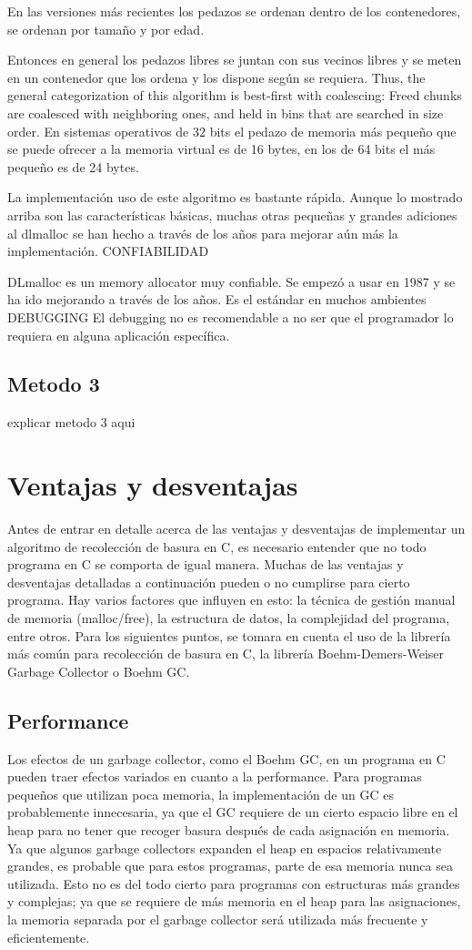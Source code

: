 \documentclass[11pt]{article} %
\begin{document}
En las versiones más recientes los pedazos se ordenan dentro de los contenedores, se ordenan por tamaño y por edad.

Entonces en general los pedazos libres se juntan con sus vecinos libres y se meten en un contenedor que los ordena y los dispone según se requiera.
Thus, the general categorization of this algorithm is best-first with coalescing: Freed chunks are coalesced with neighboring ones, and held in bins that are searched in size order.
En sistemas operativos de 32 bits el pedazo de memoria más pequeño que se puede ofrecer a la memoria virtual es de 16 bytes, en los de 64 bits el más pequeño es de 24 bytes.

La implementación  uso de este algoritmo es bastante rápida. Aunque lo mostrado arriba son las características básicas, muchas otras pequeñas y grandes adiciones al dlmalloc se han hecho a través de los años para mejorar aún más la implementación.
CONFIABILIDAD

DLmalloc es un memory allocator muy confiable. Se empezó a usar en 1987 y se ha ido mejorando a través de los años. Es el estándar en muchos ambientes
DEBUGGING
El debugging no es recomendable a no ser que el programador lo requiera en alguna aplicación específica.


\subsection{Metodo 3}
explicar metodo 3 aqui

\section{Ventajas y desventajas}
	Antes de entrar en detalle acerca de las ventajas y desventajas de implementar un algoritmo de recolección de basura en C, es necesario entender que no todo programa en C se comporta de igual manera. Muchas de las ventajas y desventajas detalladas a continuación pueden o no cumplirse para cierto programa. Hay varios factores que influyen en esto: la técnica de gestión manual de memoria (malloc/free), la estructura de datos, la complejidad del programa, entre otros.
	Para los siguientes puntos, se tomara en cuenta el uso de la librería más común para recolección de basura en C, la librería Boehm-Demers-Weiser Garbage Collector o Boehm GC.
\subsection{Performance}
	Los efectos de un garbage collector, como el Boehm GC, en un programa en C pueden traer efectos variados en cuanto a la performance. Para programas pequeños que utilizan poca memoria, la implementación de un GC es probablemente innecesaria, ya que el GC requiere de un cierto espacio libre en el heap para no tener que recoger basura después de cada asignación en memoria. Ya que algunos garbage collectors expanden el heap en espacios relativamente grandes, es probable que para estos programas, parte de esa memoria nunca sea utilizada. Esto no es del todo cierto para programas con estructuras más grandes y complejas; ya que se requiere de más memoria en el heap para las asignaciones, la memoria separada por el garbage collector será utilizada más frecuente y eficientemente.
\end{document}
